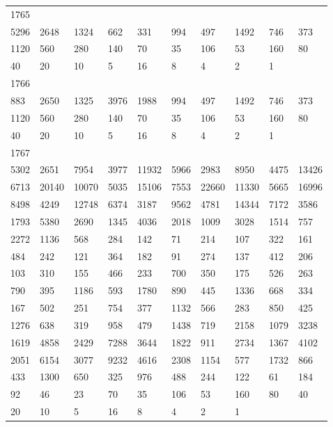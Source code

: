 \begin{longtable}{*{10}{l}}
1765&&&&&&&&&\\
5296& 2648& 1324& 662& 331& 994& 497& 1492& 746& 373\\
1120& 560& 280& 140& 70& 35& 106& 53& 160& 80\\
40& 20& 10& 5& 16& 8& 4& 2& 1& \\

1766&&&&&&&&&\\
883& 2650& 1325& 3976& 1988& 994& 497& 1492& 746& 373\\
1120& 560& 280& 140& 70& 35& 106& 53& 160& 80\\
40& 20& 10& 5& 16& 8& 4& 2& 1& \\

1767&&&&&&&&&\\
5302& 2651& 7954& 3977& 11932& 5966& 2983& 8950& 4475& 13426\\
6713& 20140& 10070& 5035& 15106& 7553& 22660& 11330& 5665& 16996\\
8498& 4249& 12748& 6374& 3187& 9562& 4781& 14344& 7172& 3586\\
1793& 5380& 2690& 1345& 4036& 2018& 1009& 3028& 1514& 757\\
2272& 1136& 568& 284& 142& 71& 214& 107& 322& 161\\
484& 242& 121& 364& 182& 91& 274& 137& 412& 206\\
103& 310& 155& 466& 233& 700& 350& 175& 526& 263\\
790& 395& 1186& 593& 1780& 890& 445& 1336& 668& 334\\
167& 502& 251& 754& 377& 1132& 566& 283& 850& 425\\
1276& 638& 319& 958& 479& 1438& 719& 2158& 1079& 3238\\
1619& 4858& 2429& 7288& 3644& 1822& 911& 2734& 1367& 4102\\
2051& 6154& 3077& 9232& 4616& 2308& 1154& 577& 1732& 866\\
433& 1300& 650& 325& 976& 488& 244& 122& 61& 184\\
92& 46& 23& 70& 35& 106& 53& 160& 80& 40\\
20& 10& 5& 16& 8& 4& 2& 1& \\


\end{longtable}
